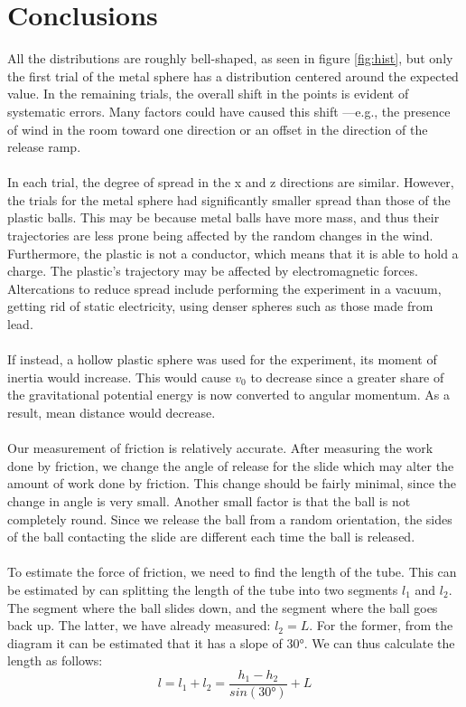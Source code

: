 \documentclass{article}
\begin{document}
\clearpage
\section{Conclusions}

All the distributions are roughly bell-shaped, as seen in figure \ref{fig:hist}, but only the first trial of the metal sphere has a distribution centered around the expected value. In the remaining trials, the overall shift in the points is evident of systematic errors. Many factors could have caused this shift ---e.g., the presence of wind in the room toward one direction or an offset in the direction of the release ramp. 
\\\\
In each trial, the degree of spread in the x and z directions are similar. However, the trials for the metal sphere had significantly smaller spread than those of the plastic balls. This may be because metal balls have more mass, and thus their trajectories are less prone being affected by the random changes in the wind. Furthermore, the plastic is not a conductor, which means that it is able to hold a charge. The plastic's trajectory may be affected by electromagnetic forces. Altercations to reduce spread include performing the experiment in a vacuum, getting rid of static electricity, using denser spheres such as those made from lead. 
\\\\
If instead, a hollow plastic sphere was used for the experiment, its moment of inertia would increase. This would cause $v_{0}$ to decrease since a greater share of the gravitational potential energy is now converted to angular momentum. As a result, mean distance would decrease. 
\\\\
Our measurement of friction is relatively accurate. After measuring the work done by friction, we change the angle of release for the slide which may alter the amount of work done by friction. This change should be fairly minimal, since the change in angle is very small. Another small factor is that the ball is not completely round. Since we release the ball from a random orientation, the sides of the ball contacting the slide are different each time the ball is released.
\\\\
To estimate the force of friction, we need to find the length of the tube. This can be estimated by can splitting the length of the tube into two segments $l_{1}$ and $l_{2}$. The segment where the ball slides down, and the segment where the ball goes back up. The latter, we have already measured: $l_{2} = L$. For the former, from the diagram it can be estimated that it has a slope of $\ang{30}$. We can thus calculate the length as follows: 
\begin{equation}
l = l_{1} + l_{2} = \frac{h_{1} - h_{2}}{sin(\ang{30})}+ L
\end{equation}
\end{document}
